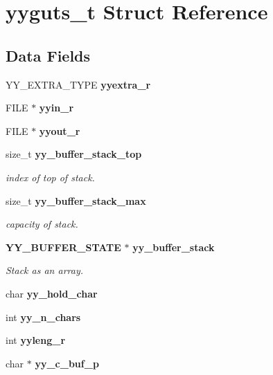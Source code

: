 \section{yyguts\-\_\-t Struct Reference}
\label{structyyguts__t}
\subsection*{Data Fields}
\begin{DoxyCompactItemize}
\item 
Y\-Y\-\_\-\-E\-X\-T\-R\-A\-\_\-\-T\-Y\-P\-E {\bfseries yyextra\-\_\-r}\label{structyyguts__t_aef05c0d6725a5214f6b30466f0b01c47}

\item 
F\-I\-L\-E $\ast$ {\bfseries yyin\-\_\-r}\label{structyyguts__t_a21f81ca100b12364a5095a37d1c6f650}

\item 
F\-I\-L\-E $\ast$ {\bfseries yyout\-\_\-r}\label{structyyguts__t_a436368a905aaf12e809e265749c74031}

\item 
size\-\_\-t {\bf yy\-\_\-buffer\-\_\-stack\-\_\-top}
\begin{DoxyCompactList}\small\item\em index of top of stack. \end{DoxyCompactList}\item 
size\-\_\-t {\bf yy\-\_\-buffer\-\_\-stack\-\_\-max}
\begin{DoxyCompactList}\small\item\em capacity of stack. \end{DoxyCompactList}\item 
{\bf Y\-Y\-\_\-\-B\-U\-F\-F\-E\-R\-\_\-\-S\-T\-A\-T\-E} $\ast$ {\bf yy\-\_\-buffer\-\_\-stack}
\begin{DoxyCompactList}\small\item\em Stack as an array. \end{DoxyCompactList}\item 
char {\bfseries yy\-\_\-hold\-\_\-char}\label{structyyguts__t_adde3f71374c223bbac47284824996e86}

\item 
int {\bfseries yy\-\_\-n\-\_\-chars}\label{structyyguts__t_a99c9218941829a6662d358422fd4184a}

\item 
int {\bfseries yyleng\-\_\-r}\label{structyyguts__t_aba739bc731f0e9cbb0b6bdfca7930ebd}

\item 
char $\ast$ {\bfseries yy\-\_\-c\-\_\-buf\-\_\-p}\label{structyyguts__t_ab1b9bcacb33aab1e02b625512bc0e221}


\end{DoxyCompactItemize}
